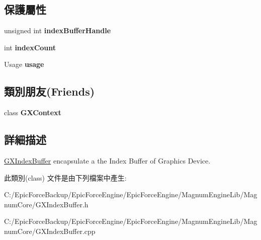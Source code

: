 \subsection*{保護屬性}
\begin{DoxyCompactItemize}
\item 
unsigned int {\bfseries index\+Buffer\+Handle}\hypertarget{class_magnum_1_1_g_x_index_buffer_a885a5695547f560a1bd668e0deaef390}{}\label{class_magnum_1_1_g_x_index_buffer_a885a5695547f560a1bd668e0deaef390}

\item 
int {\bfseries index\+Count}\hypertarget{class_magnum_1_1_g_x_index_buffer_a42084d93077896ad6283719c8a1df1b5}{}\label{class_magnum_1_1_g_x_index_buffer_a42084d93077896ad6283719c8a1df1b5}

\item 
Usage {\bfseries usage}\hypertarget{class_magnum_1_1_g_x_index_buffer_a21c8d6ca25a20381ee2d9ae1f27bb346}{}\label{class_magnum_1_1_g_x_index_buffer_a21c8d6ca25a20381ee2d9ae1f27bb346}

\end{DoxyCompactItemize}
\subsection*{類別朋友(Friends)}
\begin{DoxyCompactItemize}
\item 
class {\bfseries G\+X\+Context}\hypertarget{class_magnum_1_1_g_x_index_buffer_a2c36d7f8865080802bbad88cd73d871c}{}\label{class_magnum_1_1_g_x_index_buffer_a2c36d7f8865080802bbad88cd73d871c}

\end{DoxyCompactItemize}


\subsection{詳細描述}
\hyperlink{class_magnum_1_1_g_x_index_buffer}{G\+X\+Index\+Buffer} encapsulate a the Index Buffer of Graphics Device. 

此類別(class) 文件是由下列檔案中產生\+:\begin{DoxyCompactItemize}
\item 
C\+:/\+Epic\+Force\+Backup/\+Epic\+Force\+Engine/\+Epic\+Force\+Engine/\+Magnum\+Engine\+Lib/\+Magnum\+Core/G\+X\+Index\+Buffer.\+h\item 
C\+:/\+Epic\+Force\+Backup/\+Epic\+Force\+Engine/\+Epic\+Force\+Engine/\+Magnum\+Engine\+Lib/\+Magnum\+Core/G\+X\+Index\+Buffer.\+cpp\end{DoxyCompactItemize}
